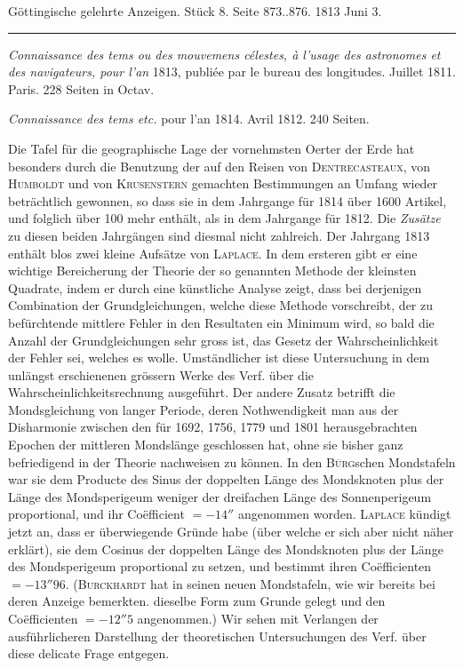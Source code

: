 \clearpage
{}
\hypertarget{native-559-lower}{}\label{native-559-lower}
\begin{center}\small Göttingische gelehrte Anzeigen. Stück 8. Seite 873..876. 1813 Juni 3.\\[3pt]\rule{.72\linewidth}{.3pt}\end{center}

\emph{Connaissance des tems ou des mouvemens célestes, à l'usage des astronomes et des navigateurs, pour l'an} 1813, publiée par le bureau des longitudes. Juillet 1811. Paris. 228 Seiten in Octav.

\emph{Connaissance des tems etc.} pour l'an 1814. Avril 1812. 240 Seiten.

Die Tafel für die geographische Lage der vornehmsten Oerter der Erde hat besonders durch die Benutzung der auf den Reisen von \textsc{Dentrecasteaux}, von \textsc{Humboldt} und von \textsc{Krusenstern} gemachten Bestimmungen an Umfang wieder beträchtlich gewonnen, so dass sie in dem Jahrgange für 1814 über 1600 Artikel, und folglich über 100 mehr enthält, als in dem Jahrgange für 1812. Die \emph{Zusätze} zu diesen beiden Jahrgängen sind diesmal nicht zahlreich. Der Jahrgang 1813 enthält blos zwei kleine Aufsätze von \textsc{Laplace}. In dem ersteren gibt er eine wichtige Bereicherung der Theorie der so genannten Methode der kleinsten Quadrate, indem er durch eine künstliche Analyse zeigt, dass bei derjenigen Combination der Grundgleichungen, welche diese Methode vorschreibt, der zu befürchtende mittlere Fehler in den Resultaten ein Minimum wird, so bald die Anzahl der Grundgleichungen sehr gross ist, das Gesetz der Wahrscheinlichkeit der Fehler sei, welches es wolle. Umständlicher ist diese Untersuchung in dem unlängst erschienenen grössern Werke des Verf. über die Wahrscheinlichkeitsrechnung ausgeführt. Der andere Zusatz betrifft die Mondsgleichung von langer Periode, deren Nothwendigkeit man aus der Disharmonie zwischen den für 1692, 1756, 1779 und 1801 herausgebrachten Epochen der mittleren Mondslänge geschlossen hat, ohne sie bisher ganz befriedigend in der Theorie nachweisen zu können. In den \textsc{Bürg}schen Mondstafeln war sie dem Producte des Sinus der doppelten Länge des Mondsknoten plus der Länge des Mondsperigeum weniger der dreifachen Länge des Sonnenperigeum proportional, und ihr Coëfficient $= -14''$ angenommen worden. \textsc{Laplace} kündigt jetzt an, dass er überwiegende Gründe habe (über welche er sich aber nicht näher erklärt), sie dem Cosinus der doppelten Länge des Mondsknoten plus der Länge des Mondsperigeum proportional zu setzen, und bestimmt ihren Coëfficienten $= -13''96$. (\textsc{Burckhardt} hat in seinen neuen Mondstafeln, wie wir bereits bei deren Anzeige bemerkten. dieselbe Form zum Grunde gelegt und den Coëfficienten $= -12''5$ angenommen.) Wir sehen mit Verlangen der ausführlicheren Darstellung der theoretischen Untersuchungen des Verf. über diese delicate Frage entgegen.

